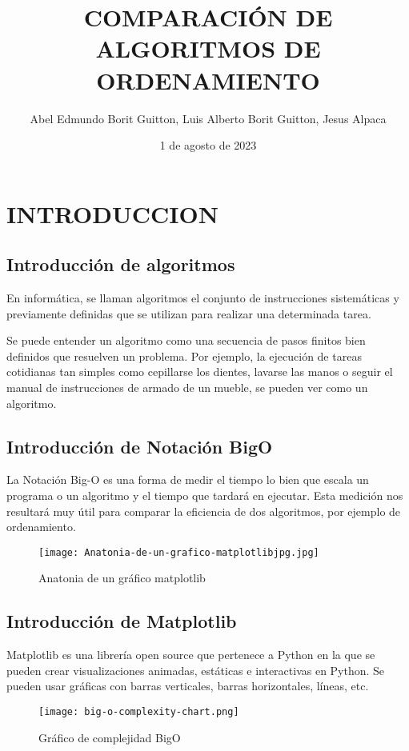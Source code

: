 \documentclass{article}
\title{\textbf{COMPARACIÓN DE ALGORITMOS DE ORDENAMIENTO}}
\author{Abel Edmundo Borit Guitton, Luis Alberto Borit Guitton, Jesus Alpaca}
\date{1 de agosto de 2023}
\begin{document}
\maketitle

\section{INTRODUCCION}
\subsection{Introducción de algoritmos}
En informática, se llaman algoritmos el conjunto de instrucciones sistemáticas y previamente definidas que se utilizan para realizar una determinada tarea.

Se puede entender un algoritmo como una secuencia de pasos finitos bien definidos que resuelven un problema. Por ejemplo, la ejecución de tareas cotidianas tan simples como cepillarse los dientes, lavarse las manos o seguir el manual de instrucciones de armado de un mueble, se pueden ver como un algoritmo.

\subsection{Introducción de Notación BigO}
La Notación Big-O es una forma de medir el tiempo lo bien que escala un programa o un algoritmo y el tiempo que tardará en ejecutar. Esta medición nos resultará muy útil para comparar la eficiencia de dos algoritmos, por ejemplo de ordenamiento.

\begin{figure}[h]
\centering
\texttt{[image: Anatonia-de-un-grafico-matplotlibjpg.jpg]}
\caption{\label{fig:matplotlib}Anatonia de un gráfico matplotlib}
\end{figure}

\subsection{Introducción de Matplotlib}
Matplotlib es una librería open source que pertenece a Python en la que se pueden crear visualizaciones animadas, estáticas e interactivas en Python. Se pueden usar gráficas con barras verticales, barras horizontales, líneas, etc.

\begin{figure}[h]
\centering
\texttt{[image: big-o-complexity-chart.png]}
\caption{\label{fig:bigo}Gráfico de complejidad BigO}
\end{figure}
\end{document}
